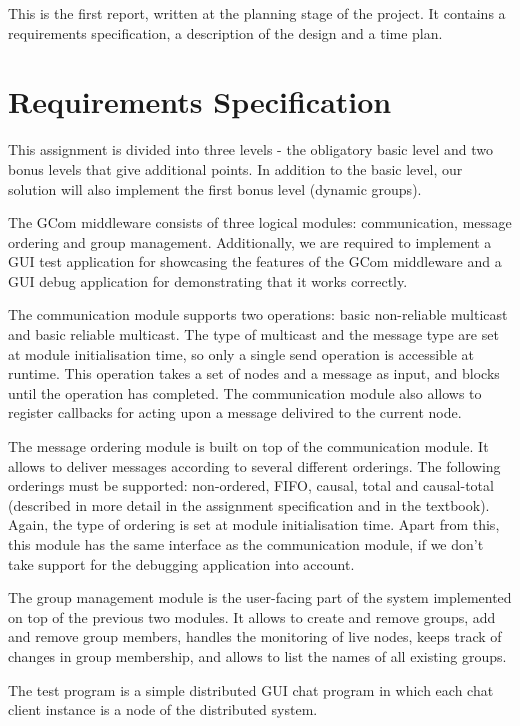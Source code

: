 \documentclass[10pt, oneside]{article}
\begin{document}
This is the first report, written at the planning stage of the project. It
contains a requirements specification, a description of the design and a time
plan.

\section{Requirements Specification}

This assignment is divided into three levels - the obligatory basic level and
two bonus levels that give additional points. In addition to the basic level,
our solution will also implement the first bonus level (dynamic groups).

The GCom middleware consists of three logical modules: communication, message
ordering and group management. Additionally, we are required to implement a GUI
test application for showcasing the features of the GCom middleware and a GUI
debug application for demonstrating that it works correctly.

The communication module supports two operations: basic non-reliable multicast
and basic reliable multicast. The type of multicast and the message type are set
at module initialisation time, so only a single send operation is accessible at
runtime. This operation takes a set of nodes and a message as input, and blocks
until the operation has completed. The communication module also allows to
register callbacks for acting upon a message delivired to the current node.

The message ordering module is built on top of the communication module. It
allows to deliver messages according to several different orderings. The
following orderings must be supported: non-ordered, FIFO, causal, total and
causal-total (described in more detail in the assignment specification and in
the textbook\cite{Textbook}). Again, the type of ordering is set at module
initialisation time. Apart from this, this module has the same interface as the
communication module, if we don't take support for the debugging application
into account.

The group management module is the user-facing part of the system implemented on
top of the previous two modules. It allows to create and remove groups, add and
remove group members, handles the monitoring of live nodes, keeps track of
changes in group membership, and allows to list the names of all existing
groups.

The test program is a simple distributed GUI chat program in which each chat
client instance is a node of the distributed system.
\end{document}
